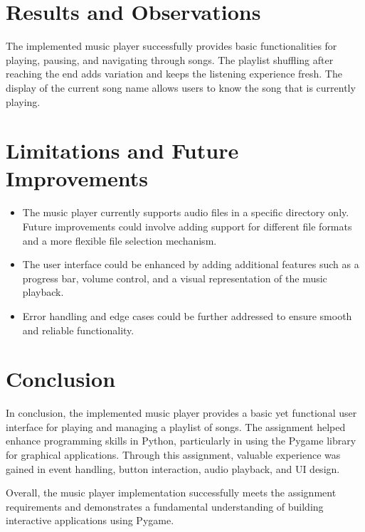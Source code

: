 \documentclass[journal,12pt,twocolumn]{IEEEtran}
\begin{document}
\section{Results and Observations}
The implemented music player successfully provides basic functionalities for playing, pausing, and navigating through songs. The playlist shuffling after reaching the end adds variation and keeps the listening experience fresh. The display of the current song name allows users to know the song that is currently playing.

\section{Limitations and Future Improvements}
\begin{itemize}
  \item The music player currently supports audio files in a specific directory only. Future improvements could involve adding support for different file formats and a more flexible file selection mechanism.
  \item The user interface could be enhanced by adding additional features such as a progress bar, volume control, and a visual representation of the music playback.
  \item Error handling and edge cases could be further addressed to ensure smooth and reliable functionality.
\end{itemize}

\section{Conclusion}
In conclusion, the implemented music player provides a basic yet functional user interface for playing and managing a playlist of songs. The assignment helped enhance programming skills in Python, particularly in using the Pygame library for graphical applications. Through this assignment, valuable experience was gained in event handling, button interaction, audio playback, and UI design.

Overall, the music player implementation successfully meets the assignment requirements and demonstrates a fundamental understanding of building interactive applications using Pygame.
\end{document}
